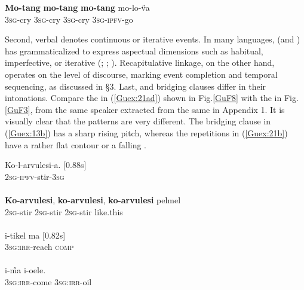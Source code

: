 \documentclass[output=paper]{LSP/langsci}
\begin{document}
\begin{exe}
\ex \label{Guex:20}
\gll    \textbf{Mo-tang}     \textbf{mo-tang}   \textbf{mo-tang} mo-lo-\H{v}a\\     	       
 \textsc{3sg}-cry    \textsc{3sg}-cry  \textsc{3sg}-cry  \textsc{3sg-ipfv}-go\\
\glt {} \citep[][266]{guerin11}
\end{exe}


Second, verbal  denotes continuous or iterative events. In many  languages,  (and ) has grammaticalized to express aspectual dimensions such as habitual, imperfective, or iterative (\citealt[][487]{besnier00}; \citealt[][117]{guerin11}; \citealt[][260]{dimock09}). Recapitulative linkage, on the other hand, operates on the level of discourse, marking event completion and temporal sequencing, as discussed in §3. Last,  and bridging clauses differ in their intonations.  Compare  the  in (\ref{Guex:21ad}) shown in Fig.\ref{GuF8} with the  in Fig.\ref{GuF3}, from the same speaker extracted from the same  in Appendix 1. It is  visually clear that the patterns are very different. The bridging clause in (\ref{Guex:13b}) has a sharp rising pitch, whereas the repetitions in (\ref{Guex:21b}) have a rather flat contour or a falling .

\begin{exe}
\ex \label{Guex:21ad}
\begin{xlist}
\ex \label{Guex:21a}
\gll Ko-l-arvulesi-a. [0.88s]       \\
\textsc{2sg-ipfv-}stir-\textsc{3sg}      \\
\glt {}\\
\ex \label{Guex:21b}
\gll \textbf{Ko-arvulesi},   \textbf{ko-arvulesi}, \textbf{ko-arvulesi} pelmel    \\
 \textsc{2sg-}stir \textsc{2sg-}stir \textsc{2sg-}stir  like.this \\
\glt {}\\
\ex \label{Guex:21c}
\gll   i-tikel              ma  [0.82s] \\
   \textsc{3sg}:\textsc{irr}-reach     \textsc{comp} \\
\glt {}\\
\ex \label{Guex:21d}
\gll   i-\H{m}a        i-oele.\\     	       
 \textsc{3sg}:\textsc{irr}-come     \textsc{3sg}:\textsc{irr}-oil\\
\glt {} 
\end{xlist}
\end{exe}
\end{document}
